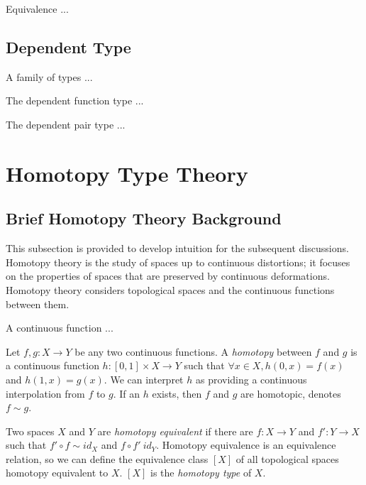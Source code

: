 \documentclass{article}
\begin{document}
\begin{definition}
Equivalence ...
\end{definition}

\subsection{Dependent Type}

\begin{definition}
  A family of types ...
\end{definition}

\begin{definition}
  The dependent function type ...
\end{definition}

\begin{definition}
  The dependent pair type ...
\end{definition}

\section{Homotopy Type Theory}

\subsection{Brief Homotopy Theory Background}

This subsection is provided to develop intuition for the subsequent discussions. Homotopy theory is the study of spaces up to continuous distortions; it focuses on the properties of spaces that are preserved by continuous deformations. Homotopy theory considers topological spaces and the continuous functions between them.

\begin{definition}
 A continuous function ...
\end{definition}

\begin{definition}
  Let $f, g : X \to Y$ be any two continuous functions. A \emph{homotopy} between $f$ and $g$ is a continuous function $h : [0, 1] \times X \to Y$ such that $\forall x \in X, h(0, x) = f(x)$ and $h(1, x) = g(x)$. We can interpret $h$ as providing a continuous interpolation from $f$ to $g$. If an $h$ exists, then $f$ and $g$ are homotopic, denotes $f \sim g$.
\end{definition}


\begin{definition}
  Two spaces $X$ and $Y$ are \emph{homotopy equivalent} if there are $f : X \to Y$ and $f' : Y \to X$ such that $f' \circ f \sim id_{X}$ and $f \circ f' ~ id_{Y}$. Homotopy equivalence is an equivalence relation, so we can define the equivalence class $[X]$ of all topological spaces homotopy equivalent to $X$. $[X]$ is the \emph{homotopy type} of $X$.
\end{definition}
\end{document}
